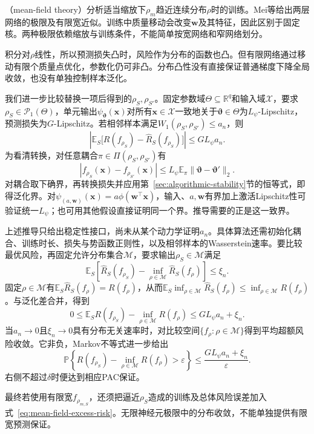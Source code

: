 （mean-field theory）分析适当缩放下$\rho_m$趋近连续分布$\rho$时的训练。Mei等给出两层网络的极限及有限宽近似。训练中质量移动会改变$\bm w$及其特征，因此区别于固定核。两种极限依赖缩放与训练条件，不能简单按宽网络和窄网络划分。

积分对$\rho$线性，所以预测损失凸时，风险作为分布的函数也凸。但有限网络通过移动有限个质量点优化，参数化仍可非凸。分布凸性没有直接保证普通梯度下降全局收敛，也没有单独控制样本泛化。

我们进一步比较替换一项后得到的$\rho_S,\rho_{S'}$。固定参数域$\Theta\subseteq\mathbb R^q$和输入域$\mathcal X$，要求$\rho_S\in\mathcal P_1(\Theta)$，单元输出$\psi_{\bm\vartheta}(\bm x)$对所有$\bm x\in\mathcal X$一致地关于$\bm\vartheta\in\Theta$为$L_\psi$-Lipschitz，预测损失为$G$-Lipschitz。若相邻样本满足$W_1(\rho_S,\rho_{S'})\leq a_n$，则
\[
 \left|\mathbb E_S\bigl[R(f_{\rho_S})-\hat R_S(f_{\rho_S})\bigr]\right|
 \leq G L_\psi a_n.
\]
为看清转换，对任意耦合$\pi\in\Pi(\rho_S,\rho_{S'})$有
\[
 |f_{\rho_S}(\bm x)-f_{\rho_{S'}}(\bm x)|
 \leq L_\psi\mathbb E_\pi
       \|\bm\vartheta-\bm\vartheta'\|_2.
\]
对耦合取下确界，再转换损失并应用第~\ref{sec:algorithmic-stability}节的恒等式，即得泛化界。对$\psi_{(a,\bm w)}(\bm x)=a\phi(\bm w^\top\bm x)$，输入、$a,\bm w$有界加上激活Lipschitz性可验证统一$L_\psi$；也可用其他假设直接证明同一个界。推导需要的正是这一致界。

上述推导只给出稳定性接口，尚未从某个动力学证明$a_n$。具体算法还需初始化耦合、训练时长、损失与势函数正则性，以及相邻样本的Wasserstein速率。要比较最优风险，再固定允许分布集合$\mathcal M$，要求输出$\rho_S\in\mathcal M$满足
\[
 \mathbb E_S\left[
   \hat R_S(f_{\rho_S})
   -\inf_{\rho\in\mathcal M}\hat R_S(f_\rho)
 \right]\leq\xi_n.
\]
固定$\rho\in\mathcal M$有$\mathbb E_S\hat R_S(f_\rho)=R(f_\rho)$，从而$\mathbb E_S\inf_{\rho\in\mathcal M}\hat R_S(f_\rho)\leq\inf_{\rho\in\mathcal M}R(f_\rho)$。与泛化差合并，得到
\begin{equation}
 0\leq
 \mathbb E_S R(f_{\rho_S})
 -\inf_{\rho\in\mathcal M}R(f_\rho)
 \leq G L_\psi a_n+\xi_n.
 \label{eq:mean-field-excess-risk}
\end{equation}
当$a_n\to0$且$\xi_n\to0$具有分布无关速率时，对比较空间$\{f_\rho:\rho\in\mathcal M\}$得到平均超额风险收敛。它非负，Markov不等式进一步给出
\[
 \mathbb P\left\{
 R(f_{\rho_S})-\inf_{\rho\in\mathcal M}R(f_\rho)>\varepsilon
 \right\}
 \leq\frac{G L_\psi a_n+\xi_n}{\varepsilon}.
\]
右侧不超过$\delta$时便达到相应PAC保证。

最终若使用有限宽$f_{\rho_{m,S}}$，还须把逼近$\rho_S$造成的训练及总体风险误差加入式~\eqref{eq:mean-field-excess-risk}。无限神经元极限中的分布收敛，不能单独提供有限宽预测保证。

